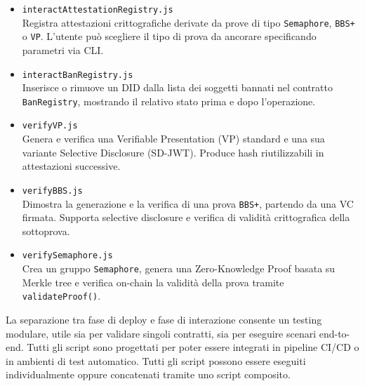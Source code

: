\begin{itemize}
                \item \texttt{interactAttestationRegistry.js} \\
                Registra attestazioni crittografiche derivate da prove di tipo \texttt{Semaphore}, \texttt{BBS+} o \texttt{VP}. L'utente può scegliere il tipo di prova da ancorare specificando parametri via CLI.
            
                \item \texttt{interactBanRegistry.js} \\
                Inserisce o rimuove un DID dalla lista dei soggetti bannati nel contratto \texttt{BanRegistry}, mostrando il relativo stato prima e dopo l’operazione.
            
                \item \texttt{verifyVP.js} \\
                Genera e verifica una Verifiable Presentation (VP) standard e una sua variante Selective Disclosure (SD-JWT). Produce hash riutilizzabili in attestazioni successive.
            
                \item \texttt{verifyBBS.js} \\
                Dimostra la generazione e la verifica di una prova \texttt{BBS+}, partendo da una VC firmata. Supporta selective disclosure e verifica di validità crittografica della sottoprova.

                \item \texttt{verifySemaphore.js} \\
                Crea un gruppo \texttt{Semaphore}, genera una Zero-Knowledge Proof basata su Merkle tree e verifica on-chain la validità della prova tramite \texttt{validateProof()}.
            \end{itemize}
        
        \noindent La separazione tra fase di deploy e fase di interazione consente un testing modulare, utile sia per validare singoli contratti, sia per eseguire scenari end-to-end. Tutti gli script sono progettati per poter essere integrati in pipeline CI/CD o in ambienti di test automatico. Tutti gli script possono essere eseguiti individualmente oppure concatenati tramite uno script composito.

